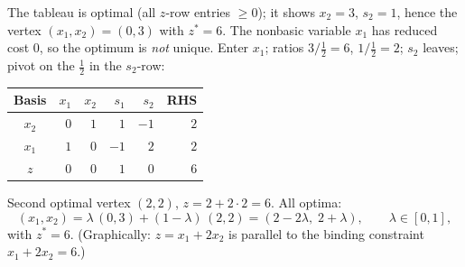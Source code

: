 \begin{solutions}
  \item The tableau is optimal (all $z$-row entries $\ge 0$); it shows
        $x_2=3$, $s_2=1$, hence the vertex $(x_1,x_2)=(0,3)$ with
        $z^{*}=6$. The nonbasic variable $x_1$ has reduced cost $0$, so the
        optimum is \emph{not} unique. Enter $x_1$; ratios
        $3/\tfrac{1}{2}=6$, $1/\tfrac{1}{2}=2$; $s_2$ leaves; pivot on the
        $\tfrac{1}{2}$ in the $s_2$-row:
        \begin{center}
        \begin{tabular}{c|rrrr|r}
        \hline
        Basis & $x_1$ & $x_2$ & $s_1$ & $s_2$ & RHS\\
        \hline
        $x_2$ & $0$ & $1$ & $1$ & $-1$ & $2$\\
        $x_1$ & $1$ & $0$ & $-1$ & $2$ & $2$\\
        \hline
        $z$ & $0$ & $0$ & $1$ & $0$ & $6$\\
        \hline
        \end{tabular}
        \end{center}
        Second optimal vertex $(2,2)$, $z=2+2\cdot 2=6$. All optima:
        \[
          (x_1,x_2)=\lambda\,(0,3)+(1-\lambda)\,(2,2)
                   =(2-2\lambda,\;2+\lambda),\qquad \lambda\in[0,1],
        \]
        with $z^{*}=6$. (Graphically: $z=x_1+2x_2$ is parallel to the
        binding constraint $x_1+2x_2=6$.)


\end{solutions}
